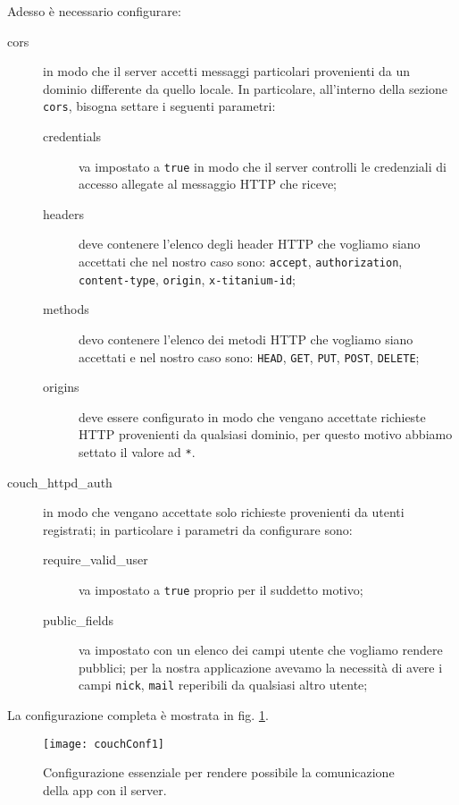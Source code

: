         \noindent Adesso è necessario configurare:
        \begin{description}
            \item[cors] in modo che il server accetti messaggi \html{}
            particolari provenienti da un dominio differente da quello locale.
            In particolare, all'interno della sezione \texttt{cors}, bisogna
            settare i seguenti parametri:
            \begin{description}
                \item[credentials] va impostato a \texttt{true} in modo che il
                server controlli le credenziali di accesso allegate al
                messaggio HTTP che riceve;
                \item[headers] deve contenere l'elenco degli header HTTP che
                vogliamo siano accettati che nel nostro caso sono:
                \texttt{accept}, \texttt{authorization},\\
                \texttt{content-type}, \texttt{origin}, \texttt{x-titanium-id};
                \item[methods] devo contenere l'elenco dei metodi HTTP che
                vogliamo siano accettati e nel nostro caso sono: \texttt{HEAD},
                \texttt{GET}, \texttt{PUT}, \texttt{POST}, \texttt{DELETE};
                \item[origins] deve essere configurato in modo che vengano
                accettate richieste HTTP provenienti da qualsiasi dominio, per
                questo motivo abbiamo settato il valore ad \texttt{*}.
            \end{description}
            \item[couch\_httpd\_auth] in modo che vengano accettate solo richieste
            provenienti da utenti registrati; in particolare i parametri da
            configurare sono:
                \begin{description}
                    \item[require\_valid\_user] va impostato a \texttt{true}
                    proprio per il suddetto motivo;
                    \item[public\_fields] va impostato con un elenco dei campi
                    utente che vogliamo rendere pubblici; per la nostra
                    applicazione avevamo la necessità di avere i campi
                    \texttt{nick}, \texttt{mail} reperibili da qualsiasi altro utente;
                \end{description}
        \end{description}
        La configurazione completa è mostrata in fig. \ref{fig:confCouch1}.
        \begin{figure}[H]
            \centering
            \texttt{[image: couchConf1]}
            \caption{
                Configurazione essenziale per rendere possibile la comunicazione
                della app con il server.
            }
            \label{fig:confCouch1}
        \end{figure}

